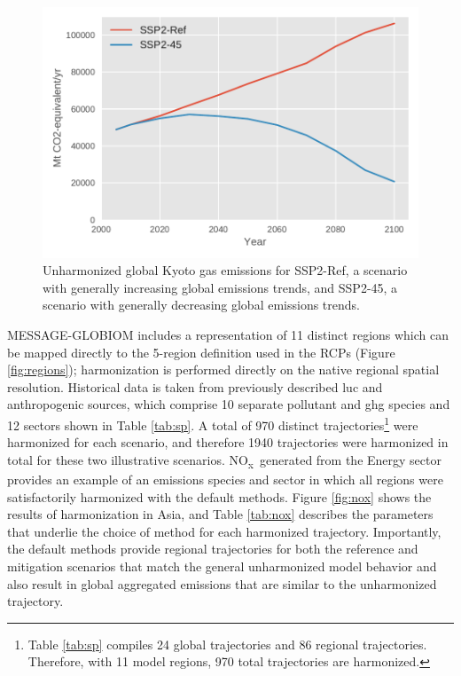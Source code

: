 \documentclass[review]{elsarticle}
\newcommand{\noxx}{NO\textsubscript{x}~}
\begin{document}
\begin{figure}
  \begin{center}
    \includegraphics[width=\textwidth]{results_kyoto.pdf}
    \caption[]{
      \label{fig:kyoto}
      Unharmonized global Kyoto gas emissions for SSP2-Ref, a scenario with
      generally increasing global emissions trends, and SSP2-45, a scenario with
      generally decreasing global emissions trends.  }
  \end{center}
\end{figure}


MESSAGE-GLOBIOM includes a representation of 11 distinct regions which can be
mapped directly to the 5-region definition used in the RCPs (Figure
\ref{fig:regions}); harmonization is performed directly on the native regional
spatial resolution. Historical data is taken from previously described \gls{luc}
and anthropogenic sources, which comprise 10 separate pollutant and \gls{ghg}
species and 12 sectors shown in Table \ref{tab:sp}. A total of 970 distinct
trajectories\footnote{Table \ref{tab:sp} compiles 24 global trajectories and 86
  regional trajectories. Therefore, with 11 model regions, 970 total
  trajectories are harmonized.} were harmonized for each scenario, and therefore
1940 trajectories were harmonized in total for these two illustrative scenarios.
\noxx generated from the Energy sector provides an example of an emissions
species and sector in which all regions were satisfactorily harmonized with the
default methods. Figure \ref{fig:nox} shows the results of harmonization in
Asia, and Table \ref{tab:nox} describes the parameters that underlie the choice
of method for each harmonized trajectory. Importantly, the default methods
provide regional trajectories for both the reference and mitigation scenarios
that match the general unharmonized model behavior and also result in global
aggregated emissions that are similar to the unharmonized trajectory.
\end{document}
